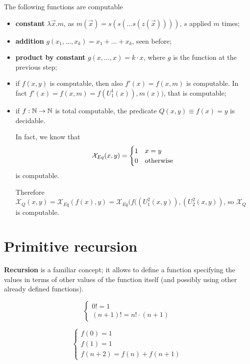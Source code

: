\begin{example}
  The following functions are computable
\begin{itemize}
\item \textbf{constant} $\lambda \vec{x}.m$, as $m(\vec{x}) = s(s(\dots s(z(\vec{x}))))$, $s$ applied $m$ times;
\item \textbf{addition} $g(x_1,\dots,x_k) = x_1 + \dots + x_k$, seen before;
\item \textbf{product by constant} $g(x,\dots,x) = k \cdot x$, where $g$ is the function at the previous step;
\item if $f(x,y)$ is computable, then also $f'(x) = f(x,m)$ is computable.
  In fact $f'(x) = f(x,m) = f(U_1^1(x)), m(x))$, that is computable;
\item if $f:\mathbb{N}\rightarrow\mathbb{N}$ is total computable, the predicate $Q(x,y)\equiv f(x) = y$ is decidable.

  In fact, we know that \begin{equation*}
    \mathcal{X}_{Eq}(x,y) = \begin{cases}
    1 & x=y         \\
    0 & $otherwise$
  \end{cases}
\end{equation*}
  is computable.

  Therefore $\mathcal{X}_Q(x,y) = \mathcal{X}_{Eq}(f(x),y) = \mathcal{X}_{Eq}(f((U_1^2(x,y)), (U_2^2(x,y))$, so $\mathcal{X}_Q$ is computable.
\end{itemize}
\end{example}


\section {Primitive recursion}

\textbf{Recursion} is a familiar concept; it allows to define a function specifying the values in terms of other values of the function itself (and possibly using other already defined functions).

\begin{example}[Factorial]
  \[
    \begin{cases}
      0! = 1\\
      (n+1)! = n! \cdot (n+1)
    \end{cases}
  \]
\end{example}

\begin{example}[Fibonacci]
  \[
    \begin{cases}
      f(0) = 1 \\
      f(1) = 1 \\
      f(n+2) = f(n) + f(n+1)
    \end{cases}
  \]
\end{example}

